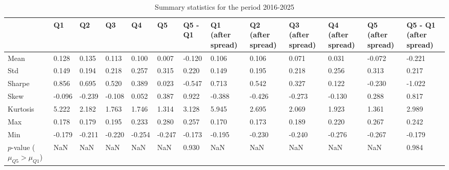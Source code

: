 \begin{table}
\caption{Summary statistics for the period 2016-2025}
\label{tab:summary_2016_2025}
\begin{tabular}{lllllllllllll}
\toprule
 & Q1 & Q2 & Q3 & Q4 & Q5 & Q5 - Q1 & Q1 (after spread) & Q2 (after spread) & Q3 (after spread) & Q4 (after spread) & Q5 (after spread) & Q5 - Q1 (after spread) \\
\midrule
Mean & 0.128 & 0.135 & 0.113 & 0.100 & 0.007 & -0.120 & 0.106 & 0.106 & 0.071 & 0.031 & -0.072 & -0.221 \\
Std & 0.149 & 0.194 & 0.218 & 0.257 & 0.315 & 0.220 & 0.149 & 0.195 & 0.218 & 0.256 & 0.313 & 0.217 \\
Sharpe & 0.856 & 0.695 & 0.520 & 0.389 & 0.023 & -0.547 & 0.713 & 0.542 & 0.327 & 0.122 & -0.230 & -1.022 \\
Skew & -0.096 & -0.239 & -0.108 & 0.052 & 0.387 & 0.922 & -0.388 & -0.426 & -0.273 & -0.130 & 0.288 & 0.817 \\
Kurtosis & 5.222 & 2.182 & 1.763 & 1.746 & 1.314 & 3.128 & 5.945 & 2.695 & 2.069 & 1.923 & 1.361 & 2.989 \\
Max & 0.178 & 0.179 & 0.195 & 0.233 & 0.280 & 0.257 & 0.170 & 0.173 & 0.189 & 0.220 & 0.267 & 0.242 \\
Min & -0.179 & -0.211 & -0.220 & -0.254 & -0.247 & -0.173 & -0.195 & -0.230 & -0.240 & -0.276 & -0.267 & -0.179 \\
$p$-value ($\mu_{Q5} > \mu_{Q1}$) & NaN & NaN & NaN & NaN & NaN & 0.930 & NaN & NaN & NaN & NaN & NaN & 0.984 \\
\bottomrule
\end{tabular}
\end{table}
